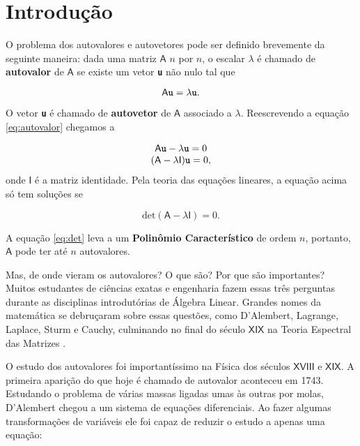 \chapter{Introdução}
\label{cap:introducao}

\setcounter{page}{12}

	O problema dos autovalores e autovetores pode ser definido brevemente da seguinte maneira: dada uma matriz $\mathsf{A}$ $n$ por $n$, o escalar $\lambda$ é chamado de \textbf{autovalor} de $\mathsf{A}$ se existe um vetor \textbf{\texttt{u}} não nulo tal que

\begin{equation}\label{eq:autovalor}
	\mathsf{A} \textbf{\texttt{u}} = \lambda \textbf{\texttt{u}}.
\end{equation}

O vetor \textbf{\texttt{u}} é chamado de \textbf{autovetor} de $\mathsf{A}$ associado a $\lambda$. Reescrevendo a equação \ref{eq:autovalor} chegamos a 

\begin{equation}
		\begin{array}{c}
			\mathsf{A} \textbf{\texttt{u}} - \lambda \textbf{\texttt{u}} = 0 \\
			(\mathsf{A} - \lambda \mathsf{I})\textbf{\texttt{u}} = 0,
		\end{array}
\end{equation}
onde $\mathsf{I}$ é a matriz identidade. Pela teoria das equações lineares, a equação acima só tem soluções se

\begin{equation}\label{eq:det}
	\mbox{det}(\mathsf{A} - \lambda \mathsf{I}) = 0.
\end{equation}

A equação \ref{eq:det} leva a um \textbf{Polinômio Característico} de ordem $n$, portanto, $\mathsf{A}$ pode ter até $n$ autovalores.

	Mas, de onde vieram os autovalores? O que são? Por que são importantes? Muitos estudantes de ciências exatas e engenharia fazem essas três perguntas durante as disciplinas introdutórias de Álgebra Linear. Grandes nomes da matemática se debruçaram sobre essas questões, como D'Alembert, Lagrange, Laplace, Sturm e Cauchy, culminando no final do século $\mathsf{XIX}$ na Teoria Espectral das Matrizes \cite{Hawkins75}.
	
	O estudo dos autovalores foi importantíssimo na Física dos séculos $\mathsf{XVIII}$ e $\mathsf{XIX}$. A primeira aparição do que hoje é chamado de autovalor aconteceu em 1743. Estudando o problema de várias massas ligadas umas às outras por molas, D'Alembert chegou a um sistema de equações diferenciais. Ao fazer algumas transformações de variáveis ele foi capaz de reduzir o estudo a apenas uma equação:

